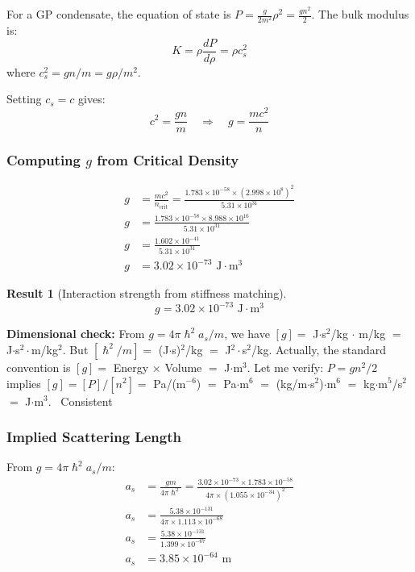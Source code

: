 \documentclass[11pt,a4paper]{article}
\newcommand{\ee}[1]{\times 10^{#1}}
\newcommand{\hbar}{\ensuremath{\hslash}}
\newcommand{\CONSISTENT}{\textcolor{green!60!black}{\checkmark~Consistent}}
\newtheorem{result}{Result}
\begin{document}
For a GP condensate, the equation of state is $P = \frac{g}{2m^2}\rho^2 = \frac{gn^2}{2}$. The bulk modulus is:
\begin{equation}
K = \rho \frac{dP}{d\rho} = \rho c_s^2
\end{equation}
where $c_s^2 = gn/m = g\rho/m^2$.

Setting $c_s = c$ gives:
\begin{equation}
c^2 = \frac{gn}{m} \quad \Rightarrow \quad g = \frac{mc^2}{n}
\end{equation}

\subsubsection{Computing $g$ from Critical Density}

\begin{align}
g &= \frac{mc^2}{n_{\mathrm{crit}}} = \frac{1.783 \ee{-58} \times (2.998 \ee{8})^2}{5.31 \ee{31}} \nonumber \\
g &= \frac{1.783 \ee{-58} \times 8.988 \ee{16}}{5.31 \ee{31}} \nonumber \\
g &= \frac{1.602 \ee{-41}}{5.31 \ee{31}} \nonumber \\
g &= 3.02 \ee{-73} \text{ J}\cdot\text{m}^3
\end{align}

\begin{result}[Interaction strength from stiffness matching]
\begin{equation}
\boxed{g = 3.02 \times 10^{-73} \text{ J}\cdot\text{m}^3}
\end{equation}
\end{result}

\textbf{Dimensional check:} From $g = 4\pi\hbar^2 a_s/m$, we have $[g] = $ J$\cdot$s$^2$/kg $\cdot$ m/kg $=$ J$\cdot$s$^2\cdot$m/kg$^2$. But $[\hbar^2/m] = $ (J$\cdot$s)$^2$/kg $=$ J$^2\cdot$s$^2$/kg. Actually, the standard convention is $[g] = $ Energy $\times$ Volume $=$ J$\cdot$m$^3$. Let me verify: $P = gn^2/2$ implies $[g] = [P]/[n^2] = $ Pa/(m$^{-6}$) $=$ Pa$\cdot$m$^6$ $=$ (kg/m$\cdot$s$^2$)$\cdot$m$^6$ $=$ kg$\cdot$m$^5$/s$^2$ $=$ J$\cdot$m$^3$. \CONSISTENT

\subsubsection{Implied Scattering Length}

From $g = 4\pi\hbar^2 a_s/m$:
\begin{align}
a_s &= \frac{gm}{4\pi\hbar^2} = \frac{3.02 \ee{-73} \times 1.783 \ee{-58}}{4\pi \times (1.055 \ee{-34})^2} \nonumber \\
a_s &= \frac{5.38 \ee{-131}}{4\pi \times 1.113 \ee{-68}} \nonumber \\
a_s &= \frac{5.38 \ee{-131}}{1.399 \ee{-67}} \nonumber \\
a_s &= 3.85 \ee{-64} \text{ m}
\end{align}
\end{document}

